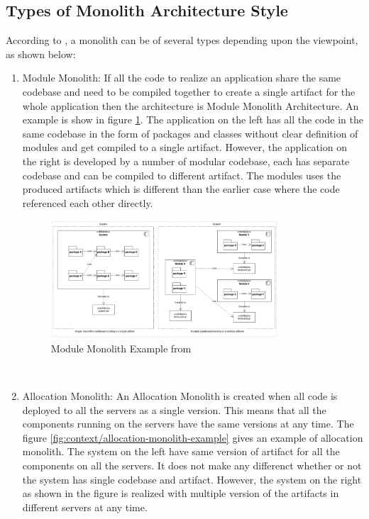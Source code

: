 \subsection{Types of Monolith Architecture Style}\label{subsection:context/monolith-types}
According to \cite{Annett:2014aa}, a monolith can be of several types depending upon the viewpoint, as shown below:
\begin{enumerate}
\item Module Monolith: If all the code to realize an application share the same codebase and need to be compiled together to create a single artifact for the whole application then the architecture is Module Monolith Architecture. An example is show in figure \ref {fig:context/module-monolith-example}. The application on the left has all the code in the same codebase in the form of packages and classes without clear definition of modules and get compiled to a single artifact. However, the application on the right is developed by a number of modular codebase, each has separate codebase and can be compiled to different artifact. The modules uses the produced artifacts which is different than the earlier case where the code referenced each other directly.
\begin{figure}[H]
\begin{center}
\includegraphics[width=0.8\textwidth]{figures/context-module-monolith}
\caption{Module Monolith Example from \cite{Annett:2014aa}}
\label{fig:context/module-monolith-example}
\end{center}
\end{figure}
\\
\item Allocation Monolith: An Allocation Monolith is created when all code is deployed to all the servers as a single version. This means that all the components running on the servers have the same versions at any time. The figure \ref{fig:context/allocation-monolith-example} gives an example of allocation monolith. The system on the left have same version of artifact for all the components on all the servers. It does not make any differenct whether or not the system has single codebase and artifact. However, the system on the right as shown in the figure is realized with multiple version of the artifacts in different servers at any time.

\end{enumerate}
